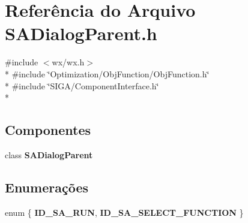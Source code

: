 \section{Referência do Arquivo S\+A\+Dialog\+Parent.\+h}
\label{_s_a_dialog_parent_8h}
{\ttfamily \#include $<$wx/wx.\+h$>$}\\*
{\ttfamily \#include \char`\"{}Optimization/\+Obj\+Function/\+Obj\+Function.\+h\char`\"{}}\\*
{\ttfamily \#include \char`\"{}S\+I\+G\+A/\+Component\+Interface.\+h\char`\"{}}\\*
\subsection*{Componentes}
\begin{DoxyCompactItemize}
\item 
class {\bf S\+A\+Dialog\+Parent}
\end{DoxyCompactItemize}
\subsection*{Enumerações}
\begin{DoxyCompactItemize}
\item 
enum \{ {\bf I\+D\+\_\+\+S\+A\+\_\+\+R\+UN}, 
{\bf I\+D\+\_\+\+S\+A\+\_\+\+S\+E\+L\+E\+C\+T\+\_\+\+F\+U\+N\+C\+T\+I\+ON}
 \}
\end{DoxyCompactItemize}
